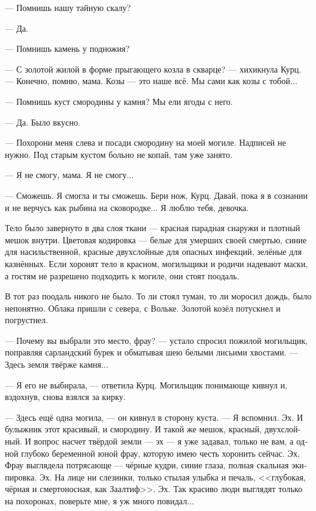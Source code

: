 \documentclass[a4paper,12pt,fleqn]{book}\usepackage{polyglossia}\setdefaultlanguage[babelshorthands=true]{russian}\setotherlanguage{english}\defaultfontfeatures{Ligatures=TeX,Mapping=tex-text}\usepackage{xcolor}\newcommand{\ml}[3]{#2}
\begin{document}
\ml{$0$}
{--- Помнишь нашу тайную скалу?}
{``Do you remember our secret rock?''}

--- Да.

--- Помнишь камень у подножия?

--- С золотой жилой в форме прыгающего козла в скварце? --- хихикнула Курц.
--- Конечно, помню, мама.
Козы --- это наше всё.
Мы сами как козы с тобой...

--- Помнишь куст смородины у камня?
Мы ели ягоды с него.

--- Да.
Было вкусно.

--- Похорони меня слева и посади смородину на моей могиле.
Надписей не нужно.
Под старым кустом больно не копай, там уже занято.

--- Я не смогу, мама.
Я не смогу...

\ml{$0$}
{--- Сможешь.}
{``You will.}
\ml{$0$}
{Я смогла и ты сможешь.}
{I did, and you will, too.}
\ml{$0$}
{Бери нож, Курц.}
{Take the knife, Kurz.}
\ml{$0$}
{Давай, пока я в сознании и не верчусь как рыбина на сковородке...}
{Go on, while I'm concious and don't twist like a fish in a pan ....}
\ml{$0$}
{Я люблю тебя, девочка.}
{I love you, girl.''}

Тело было завернуто в два слоя ткани --- красная парадная снаружи и плотный мешок внутри.
Цветовая кодировка --- белые для умерших своей смертью, синие для насильственной, красные двухслойные для опасных инфекций, зелёные для казнённых.
Если хоронят тело в красном, могильщики и родичи надевают маски, а гостям не разрешено подходить к могиле, они стоят поодаль.

В тот раз поодаль никого не было.
То ли стоял туман, то ли моросил дождь, было непонятно.
Облака пришли с севера, с Вольке.
Золотой козёл потускнел и погрустнел.

--- Почему вы выбрали это место, фрау? --- устало спросил пожилой могильщик, поправляя сарландский бурек и обматывая шею белыми лисьими хвостами.
--- Здесь земля твёрже камня...

--- Я его не выбирала, --- ответила Курц.
Могильщик понимающе кивнул и, вздохнув, снова взялся за кирку.

--- Здесь ещё одна могила, --- он кивнул в сторону куста.
--- Я вспомнил.
Эх.
И булыжник этот красивый, и смородину.
И такой же мешок, красный, двухслойный.
И вопрос насчет твёрдой земли --- эх --- я уже задавал, только не вам, а одной глубоко беременной юной фрау, которую имею честь хоронить сейчас.
Эх.
Фрау выглядела потрясающе --- чёрные кудри, синие глаза, полная скальная экипировка.
Эх.
На лице ни слезинки, только стылая улыбка и печаль, <<глубокая, чёрная и смертоносная, как Заалтиф>>.
Эх.
Так красиво люди выглядят только на похоронах, поверьте мне, я уж много повидал...
\end{document}
